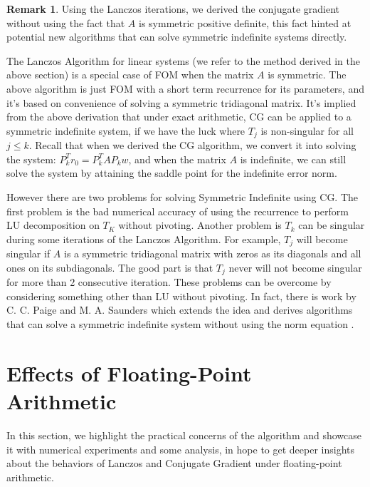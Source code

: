 \documentclass[]{article}
\theoremstyle{definition}
\newtheorem{remark}{Remark}[subsection]  %
\begin{document}
            \begin{remark}
                Using the Lanczos iterations, we derived the conjugate gradient without using the fact that $A$ is symmetric positive definite, this fact hinted at potential new algorithms that can solve symmetric indefinite systems directly. 
                \par
                The Lanczos Algorithm for linear systems (we refer to the method derived in the above section) is a special case of FOM \cite{paper:FOM} when the matrix $A$ is symmetric. The above algorithm is just FOM with a short term recurrence for its parameters, and it's based on convenience of solving a symmetric tridiagonal matrix. It's implied from the above derivation that under exact arithmetic, CG can be applied to a symmetric indefinite system, if we have the luck where $T_j$ is non-singular for all $j\le k$. Recall that when we derived the CG algorithm, we convert it into solving the system: $P^T_kr_0 = P_k^TAP_kw$, and when the matrix $A$ is indefinite, we can still solve the system by attaining the saddle point for the indefinite error norm. 
                \par
                However there are two problems for solving Symmetric Indefinite using CG. The first problem is the bad numerical accuracy of using the recurrence to perform LU decomposition on $T_K$ without pivoting. Another problem is $T_k$ can be singular during some iterations of the Lanczos Algorithm. For example, $T_j$ will become singular if $A$ is a symmetric tridiagonal matrix with zeros as its diagonals and all ones on its subdiagonals. The good part is that $T_j$ never will not become singular for more than 2 consecutive iteration\cite{paper:greenbaum_indefinite_lanczos}. These problems can be overcome by considering something other than LU without pivoting. In fact, there is work by C. C. Paige and M. A. Saunders which extends the idea and derives algorithms that can solve a symmetric indefinite system without using the norm equation \cite{paper:SYMLQ}. 
            \end{remark}
        
\section{Effects of Floating-Point Arithmetic}
    In this section, we highlight the practical concerns of the algorithm and showcase it with numerical experiments and some analysis, in hope to get deeper insights about the behaviors of Lanczos and Conjugate Gradient under floating-point arithmetic. 
\end{document}
